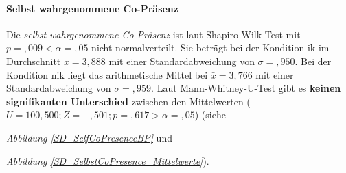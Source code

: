 \documentclass[a4paper,11pt]{article}%
\renewcommand{\\}{\vspace*{0.5\baselineskip} \newline}
\begin{document}
{{{{{{{{{{{{{{\newpage

\paragraph{Selbst wahrgenommene Co-Präsenz}
Die \textit{selbst wahrgenommene Co-Präsenz} ist laut Shapiro-Wilk-Test mit $p =,009 < \alpha = ,05$ nicht normalverteilt.
Sie beträgt bei der Kondition \ac{ik} im Durchschnitt $\bar{x} = 3,888$ mit einer Standardabweichung von $\sigma =,950$.
Bei der Kondition \newline \ac{nik} liegt das arithmetische Mittel bei $\bar{x} = 3,766$ mit einer Standardabweichung von $\sigma =,959$. 
Laut Mann-Whitney-U-Test gibt es \textbf{keinen signifikanten Unterschied} zwischen den Mittelwerten ($U = 100,500; Z = -,501; p =,617 > \alpha = ,05$) (siehe {\textit{Abbildung \ref{SD_SelfCoPresenceBP}} und {\textit{Abbildung \ref{SD_SelbstCoPresence_Mittelwerte}}).
	
}}}}}}}}}}}}}}}}
\end{document}
